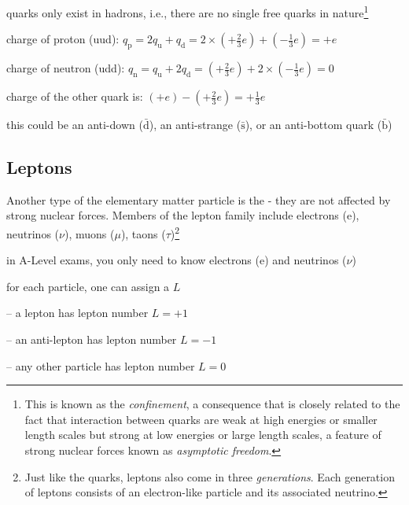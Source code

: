 \cmt quarks only exist in hadrons, i.e., there are no single free quarks in nature\footnote{This is known as the \emph{confinement}, a consequence that is closely related to the fact that interaction between quarks are weak at high energies or smaller length scales but strong at low energies or large length scales, a feature of strong nuclear forces known as \emph{asymptotic freedom}.}



\begin{soln} charge of proton (uud): $q_\text{p} = 2q_\text{u} + q_\text{d} = 2\times\left(+\frac{2}{3}e\right) + \left(-\frac{1}{3}e\right) = +e$

\eqyskip charge of neutron (udd): $q_\text{n} = q_\text{u} + 2q_\text{d} = \left(+\frac{2}{3}e\right) + 2\times\left(-\frac{1}{3}e\right) = 0$ \end{soln}


\begin{soln} charge of the other quark is: $(+e) - \left(+\frac{2}{3}e\right) = +\frac{1}{3}e$

this could be an anti-down ($\bar{\text{d}}$), an anti-strange ($\bar{\text{s}}$), or an anti-bottom quark ($\bar{\text{b}}$)\end{soln}



\subsection{Leptons}

Another type of the elementary matter particle is the  - they are not affected by strong nuclear forces. Members of the lepton family include electrons (e), neutrinos ($\nu$), muons ($\mu$), taons ($\tau$)\footnote{Just like the quarks, leptons also come in three \emph{generations}. Each generation of leptons consists of an electron-like particle and its associated neutrino.}

in A-Level exams, you only need to know electrons (e) and neutrinos ($\nu$)


\cmt for each particle, one can assign a  $L$

\begin{compactitem}
	\item[--] a lepton has lepton number $L=+1$
	
	\item[--] an anti-lepton has lepton number $L=-1$
	
	 \item[--]any other particle has lepton number $L=0$
\end{compactitem}

